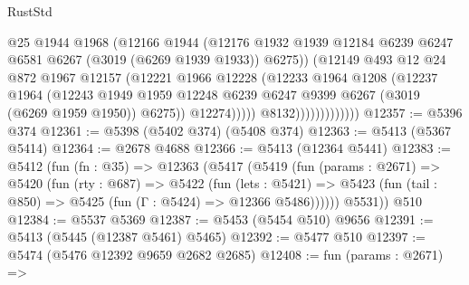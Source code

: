 \begin{lexlean}{RustStd}
\begin{coremodule}
                                  @25
                                  @1944
                                  @1968
                                  (@12166
                                    @1944
                                    (@12176
                                      @1932
                                      @1939
                                      @12184
                                      @6239
                                      @6247
                                      @6581
                                      @6267
                                      (@3019 (@6269 @1939 @1933))
                                      @6275))
                                  (@12149
                                    @493
                                    @12
                                    @24
                                    @872
                                    @1967
                                    @12157
                                    (@12221
                                      @1966
                                      @12228
                                      (@12233
                                        @1964
                                        @1208
                                        (@12237
                                          @1964
                                          (@12243
                                            @1949
                                            @1959
                                            @12248
                                            @6239
                                            @6247
                                            @9399
                                            @6267
                                            (@3019 (@6269 @1959 @1950))
                                            @6275))
                                        @12274)))))
                              @8132)))))))))))))
@12357 := @5396 @374
@12361 := @5398 (@5402 @374) (@5408 @374)
@12363 := @5413 (@5367 @5414)
@12364 := @2678 @4688
@12366 := @5413 (@12364 @5441)
@12383 := @5412
    (fun (fn : @35) =>
    @12363
      (@5417
        (@5419
          (fun (params : @2671) =>
          @5420
            (fun (rty : @687) =>
            @5422
              (fun (lets : @5421) =>
              @5423 (fun (tail : @850) => @5425 (fun (Γ : @5424) => @12366 @5486))))))
        @5531))
    @510
@12384 := @5537 @5369
@12387 := @5453 (@5454 @510) @9656
@12391 := @5413 (@5445 (@12387 @5461) @5465)
@12392 := @5477 @510
@12397 := @5474 (@5476 @12392 @9659 @2682 @2685)
@12408 := fun (params : @2671) =>

\end{coremodule}
\end{lexlean}
